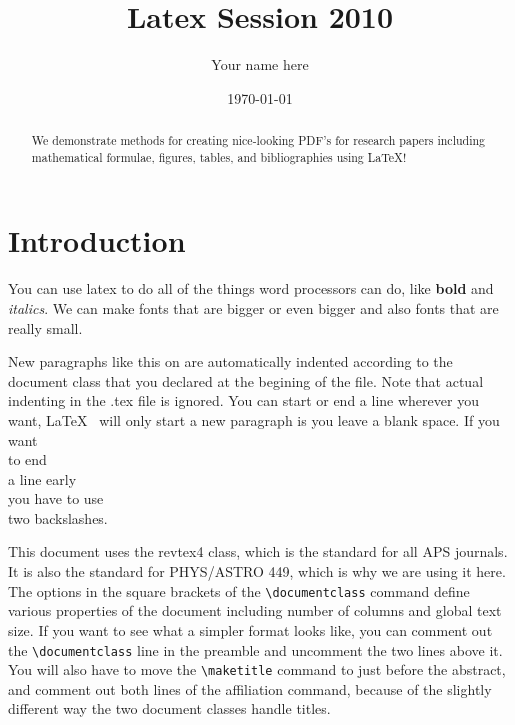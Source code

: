 \documentclass[twocolumn,10 pt,showpacs,preprintnumbers,amsmath,amssymb]{revtex4-1}%
\begin{document}
\title{Latex Session 2010}

\author{Your name here}

\date{\today}

\begin{abstract}
We demonstrate methods for creating nice-looking PDF's for research
papers including mathematical formulae, figures, tables, and bibliographies 
using \LaTeX !
\end{abstract}

\maketitle

\section{Introduction}

You can use latex to do all of the things word processors can do, like
{\bf bold} and {\it italics}.  We can make fonts that are {\Large bigger} or 
even {\Huge bigger} and also fonts that are really {\tiny small}.

New paragraphs like this on are automatically indented according to the document
class that you declared at the begining of the file.  
      Note that actual indenting in the .tex file is ignored.
  You can start or end a line wherever you want, \LaTeX~ will only start a new 
        paragraph is you leave a blank space.
If you want\\ to end\\ a line early\\ you have to use\\ two backslashes.
        
This document uses the 
revtex4 class, which is the standard for all APS journals. It is also the standard
for PHYS/ASTRO 449, which is why we are using it here. The options in the square
brackets of the \verb_\documentclass_ command define various properties of the
document including number of columns and global text size. If you want to see what
a simpler format looks like, you can comment out the \verb_\documentclass_ 
line in the preamble and uncomment the two lines above it. You will also have to
move the \verb_\maketitle_ command to just before the abstract, and comment out both
lines of the affiliation command, because of the slightly different way the two 
document classes handle titles.
\end{document}
